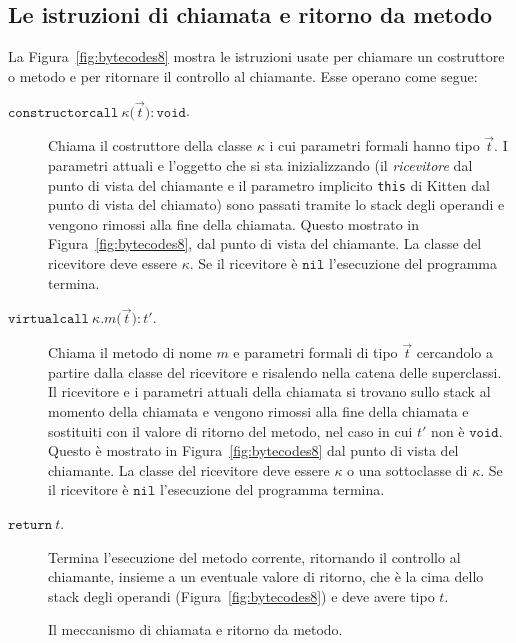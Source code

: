 \subsection{Le istruzioni di chiamata e ritorno da metodo}
  \label{subsec:call_return}
%
La Figura~\ref{fig:bytecodes8} mostra le istruzioni usate per chiamare
un costruttore o metodo e per ritornare il controllo al chiamante.
Esse operano come segue:
%
\begin{description}
\item[\underline{$\mathtt{constructorcall\ \kappa
  (}$$\vec{t}$$\mathtt{):void}$}.]
  Chiama il costruttore della classe $\kappa$ i cui parametri formali hanno
  tipo $\vec{t}$. I parametri attuali e l'oggetto che si sta inizializzando
  (\cioe il \emph{ricevitore} dal punto di vista del chiamante e
  il parametro implicito \texttt{this} di Kitten dal punto di vista del
  chiamato) sono passati
  tramite lo stack degli operandi e vengono rimossi alla fine
  della chiamata. Questo \e mostrato in Figura~\ref{fig:bytecodes8}, dal punto
  di vista del chiamante. La classe del ricevitore deve essere $\kappa$.
  Se il ricevitore \`e $\mathtt{nil}$ l'esecuzione del programma termina.
\item[\underline{$\mathtt{virtualcall\ \kappa.\mathit{m}
  (}$$\vec{t}$$\mathtt{):\mathit{t'}}$}.]
  Chiama il metodo di nome $m$ e parametri formali di tipo $\vec{\mathit{t}}$
  cercandolo a partire dalla classe del ricevitore e risalendo nella
  catena delle superclassi. Il ricevitore e i parametri attuali della chiamata
  si trovano sullo stack al momento della chiamata e vengono rimossi
  alla fine della chiamata e sostituiti con il valore di ritorno del metodo,
  nel caso in cui $\mathit{t'}$ non \`e $\mathtt{void}$. Questo \`e
  mostrato in Figura~\ref{fig:bytecodes8} dal punto di vista del chiamante.
  La classe del ricevitore deve essere $\kappa$ o una sottoclasse di $\kappa$.
  Se il ricevitore \`e $\mathtt{nil}$ l'esecuzione del programma termina.
\item[\underline{$\mathtt{return\ \mathit{t}}$}.]
  Termina l'esecuzione del metodo corrente, ritornando il controllo al
  chiamante, insieme a un eventuale valore di ritorno, che \`e la cima dello
  stack degli operandi (Figura~\ref{fig:bytecodes8}) e deve avere tipo $t$.
\end{description}
%
\begin{figure}[t]
\begin{center}
\end{center}
\caption{Il meccanismo di chiamata e ritorno da metodo.}
  \label{fig:callercallee}
\end{figure}


